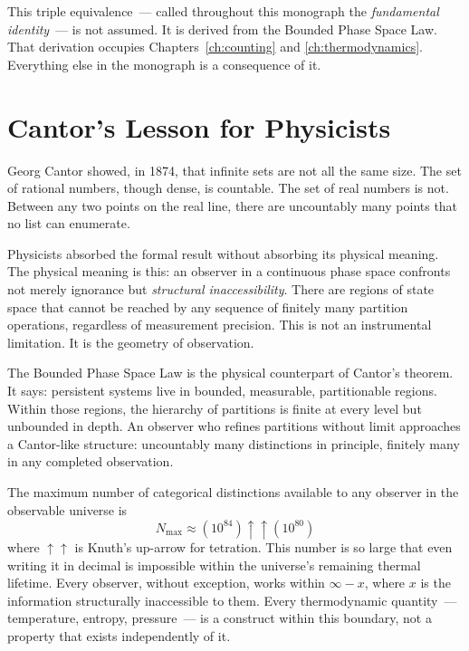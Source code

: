 This triple equivalence~--- called throughout this monograph the
\emph{fundamental identity}~--- is not assumed. It is derived from the
Bounded Phase Space Law. That derivation occupies Chapters~\ref{ch:counting}
and \ref{ch:thermodynamics}. Everything else in the monograph is a consequence of it.


\section*{Cantor's Lesson for Physicists}

Georg Cantor showed, in 1874, that infinite sets are not all the same size.
The set of rational numbers, though dense, is countable. The set of real numbers
is not. Between any two points on the real line, there are uncountably many points
that no list can enumerate.

Physicists absorbed the formal result without absorbing its physical meaning.
The physical meaning is this: an observer in a continuous phase space confronts
not merely ignorance but \emph{structural inaccessibility}. There are regions of
state space that cannot be reached by any sequence of finitely many partition
operations, regardless of measurement precision. This is not an instrumental
limitation. It is the geometry of observation.

The Bounded Phase Space Law is the physical counterpart of Cantor's theorem.
It says: persistent systems live in bounded, measurable, partitionable regions.
Within those regions, the hierarchy of partitions is finite at every level but
unbounded in depth. An observer who refines partitions without limit approaches
a Cantor-like structure: uncountably many distinctions in principle, finitely many
in any completed observation.

The maximum number of categorical distinctions available to any observer in the
observable universe is
\[
  N_{\max} \approx (10^{84})\uparrow\uparrow(10^{80})
\]
where $\uparrow\uparrow$ is Knuth's up-arrow for tetration. This number is so large
that even writing it in decimal is impossible within the universe's remaining
thermal lifetime. Every observer, without exception, works within $\infty - x$,
where $x$ is the information structurally inaccessible to them. Every thermodynamic
quantity~--- temperature, entropy, pressure~--- is a construct within this boundary,
not a property that exists independently of it.


